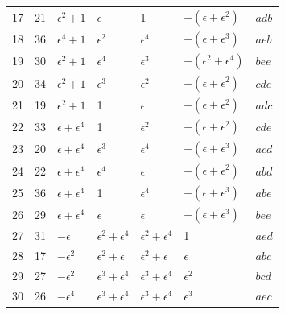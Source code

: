 \documentclass[11pt,a4paper]{article}
\begin{document}
\begin{center}
\begin{longtable}{r|r|l|l|l|l|l}
17 & 21 & $\epsilon^{2} + 1$ & $\epsilon$ & 1
                              & $-(\epsilon + \epsilon^{2})$ & $adb$\\
18 & 36 & $\epsilon^{4} + 1$ & $\epsilon^{2}$ & $\epsilon^{4}$
                              & $-(\epsilon + \epsilon^{3})$ & $aeb$\\
19 & 30 & $\epsilon^{2} + 1$ & $\epsilon^{4}$ & $\epsilon^{3}$
                              & $-(\epsilon^{2} + \epsilon^{4})$ & $bee$\\
20 & 34 & $\epsilon^{2} + 1$ & $\epsilon^{3}$ & $\epsilon^{2}$
                              & $-(\epsilon + \epsilon^{2})$ & $cde$\\
21 & 19 & $\epsilon^{2} + 1$ & 1 & $\epsilon$
                              & $-(\epsilon + \epsilon^{2})$ & $adc$\\
22 & 33 & $\epsilon + \epsilon^{4}$ & 1 & $\epsilon^{2}$
                              & $-(\epsilon + \epsilon^{2})$ & $cde$\\
23 & 20 & $\epsilon + \epsilon^{4}$ & $\epsilon^{3}$ & $\epsilon^{4}$
                              & $-(\epsilon + \epsilon^{3})$ & $acd$\\
24 & 22 & $\epsilon + \epsilon^{4}$ & $\epsilon^{4}$ & $\epsilon$
                              & $-(\epsilon + \epsilon^{2})$ & $abd$\\
25 & 36 & $\epsilon + \epsilon^{4}$ & 1 & $\epsilon^{4}$
                              & $-(\epsilon + \epsilon^{3})$ & $abe$\\
26 & 29 & $\epsilon + \epsilon^{4}$ & $\epsilon$ & $\epsilon$
                              & $-(\epsilon + \epsilon^{3})$ & $bee$\\
27 & 31 & $-\epsilon$                & $\epsilon^{2} + \epsilon^{4}$
                                     & $\epsilon^{2} + \epsilon^{4}$
                              & 1 & $aed$\\
28 & 17 & $-\epsilon^{2}$            & $\epsilon^{2} + \epsilon$
                                     & $\epsilon^{2} + \epsilon$
                              & $\epsilon$ & $abc$\\
29 & 27 & $-\epsilon^{2}$            & $\epsilon^{3} + \epsilon^{4}$
                                     & $\epsilon^{3} + \epsilon^{4}$
                              & $\epsilon^{2}$ & $bcd$\\
30 & 26 & $-\epsilon^{4}$            & $\epsilon^{3} + \epsilon^{4}$
                                     & $\epsilon^{3} + \epsilon^{4}$
                              & $\epsilon^{3}$ & $aec$\\

\end{longtable}
\end{center}
\end{document}
